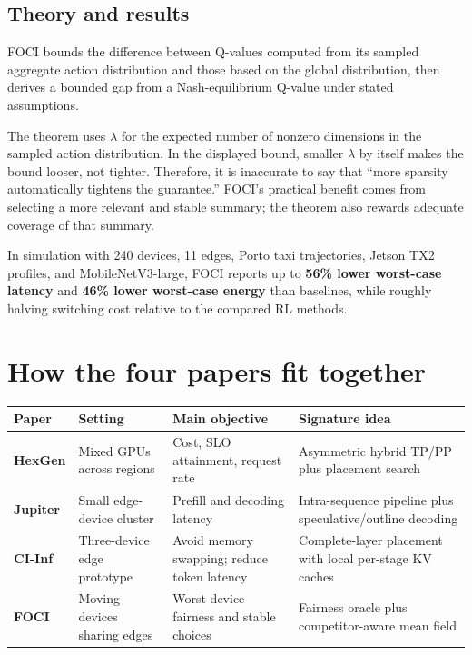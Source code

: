 \documentclass[10pt,a4paper]{article}
\begin{document}
\subsection{Theory and results}

FOCI bounds the difference between Q-values computed from its sampled aggregate action distribution and those based on the global distribution, then derives a bounded gap from a Nash-equilibrium Q-value under stated assumptions.

\begin{cautionbox}
The theorem uses $\lambda$ for the expected number of nonzero dimensions in the sampled action distribution. In the displayed bound, smaller $\lambda$ by itself makes the bound looser, not tighter. Therefore, it is inaccurate to say that ``more sparsity automatically tightens the guarantee.'' FOCI's practical benefit comes from selecting a more relevant and stable summary; the theorem also rewards adequate coverage of that summary.
\end{cautionbox}

\begin{resultbox}
In simulation with 240 devices, 11 edges, Porto taxi trajectories, Jetson TX2 profiles, and MobileNetV3-large, FOCI reports up to \textbf{56\% lower worst-case latency} and \textbf{46\% lower worst-case energy} than baselines, while roughly halving switching cost relative to the compared RL methods.
\end{resultbox}

\section{How the four papers fit together}

\begin{tabularx}{\textwidth}{>{\bfseries}p{1.6cm}p{2.5cm}p{2.6cm}X}
\toprule
Paper & Setting & Main objective & Signature idea \\
\midrule
HexGen & Mixed GPUs across regions & Cost, SLO attainment, request rate & Asymmetric hybrid TP/PP plus placement search \\
Jupiter & Small edge-device cluster & Prefill and decoding latency & Intra-sequence pipeline plus speculative/outline decoding \\
CI-Inf & Three-device edge prototype & Avoid memory swapping; reduce token latency & Complete-layer placement with local per-stage KV caches \\
FOCI & Moving devices sharing edges & Worst-device fairness and stable choices & Fairness oracle plus competitor-aware mean field \\
\bottomrule
\end{tabularx}
\end{document}
